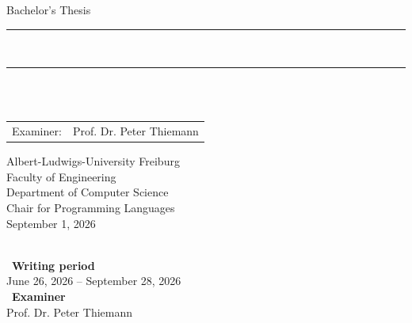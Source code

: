 
\begin{titlepage}
\begin{center}

\newcommand{\HorizontalLine}{\rule{\linewidth}{0.3mm}}

{\Large Bachelor's Thesis}\\[1.3cm]


\HorizontalLine \\[0.4cm]
{ \huge \bfseries \thetitle }
\HorizontalLine \\[1.5cm]


{\Huge \theauthor} \\[2cm]


\begin{tabular}[hc]{>{\huge}l >{\huge}l}
  Examiner: & Prof. Dr. Peter Thiemann \\[0.3cm]
\end{tabular}
\vfill  %

\Large {
    Albert-Ludwigs-University Freiburg\\
    Faculty of Engineering\\
    Department of Computer Science\\
    Chair for Programming Languages\\[1cm]

    September 1, 2026\\
}
\end{center}
\end{titlepage}

\thispagestyle{empty}
\ \vfill \ \\  %
\
\textbf{Writing period}            \smallskip{} \\
June 26, 2026 -- September 28, 2026   \bigskip{} \\
\
\textbf{Examiner}                  \smallskip{} \\
Prof. Dr. Peter Thiemann               \bigskip{} \\
\
